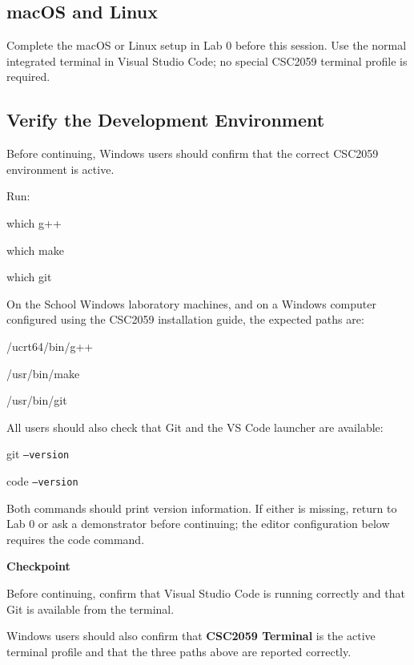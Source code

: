 \documentclass{csc2059practical}
\begin{document}
\subsection{macOS and Linux}

Complete the macOS or Linux setup in Lab 0 before this session. Use the normal integrated terminal in Visual Studio Code; no special CSC2059 terminal profile is required.

\subsection{Verify the Development Environment}

Before continuing, Windows users should confirm that the correct CSC2059 environment is active.

Run:

\begin{terminalplain}
which g++

which make

which git
\end{terminalplain}

On the School Windows laboratory machines, and on a Windows computer configured using the CSC2059 installation guide, the expected paths are:

\begin{terminalplain}
/ucrt64/bin/g++

/usr/bin/make

/usr/bin/git
\end{terminalplain}

All users should also check that Git and the VS Code launcher are available:

\begin{terminalplain}
git \texttt{--version}

code \texttt{--version}
\end{terminalplain}

Both commands should print version information. If either is missing, return to Lab 0 or ask a demonstrator before continuing; the editor configuration below requires the code command.

\begin{reflectionbox}
\textbf{Checkpoint}\par
\medskip

Before continuing, confirm that Visual Studio Code is running correctly and that Git is available from the terminal.

Windows users should also confirm that \textbf{CSC2059 Terminal} is the active terminal profile and that the three paths above are reported correctly.
\end{reflectionbox}
\end{document}
